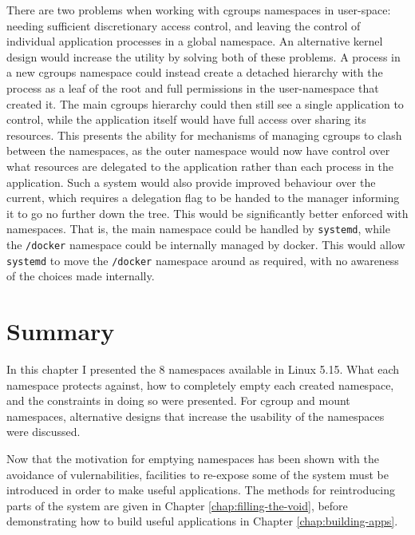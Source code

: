 \documentclass[12pt,a4paper,twoside]{report}
\begin{document}
There are two problems when working with cgroups namespaces in user-space: needing sufficient discretionary access control, and leaving the control of individual application processes in a global namespace. An alternative kernel design would increase the utility by solving both of these problems. A process in a new cgroups namespace could instead create a detached hierarchy with the process as a leaf of the root and full permissions in the user-namespace that created it. The main cgroups hierarchy could then still see a single application to control, while the application itself would have full access over sharing its resources.  This presents the ability for mechanisms of managing cgroups to clash between the namespaces, as the outer namespace would now have control over what resources are delegated to the application rather than each process in the application. Such a system would also provide improved behaviour over the current, which requires a delegation flag to be handed to the manager informing it to go no further down the tree. This would be significantly better enforced with namespaces. That is, the main namespace could be handled by \texttt{systemd}, while the \texttt{/docker} namespace could be internally managed by docker. This would allow \texttt{systemd} to move the \texttt{/docker} namespace around as required, with no awareness of the choices made internally.


\section{Summary}

In this chapter I presented the 8 namespaces available in Linux 5.15. What each namespace protects against, how to completely empty each created namespace, and the constraints in doing so were presented. For cgroup and mount namespaces, alternative designs that increase the usability of the namespaces were discussed.

Now that the motivation for emptying namespaces has been shown with the avoidance of vulernabilities, facilities to re-expose some of the system must be introduced in order to make useful applications. The methods for reintroducing parts of the system are given in Chapter \ref{chap:filling-the-void}, before demonstrating how to build useful applications in Chapter \ref{chap:building-apps}.
\end{document}
